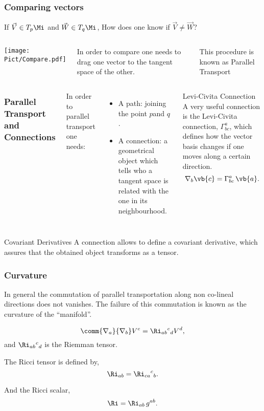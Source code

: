 \begin{frame}
  \frametitle{Comparing vectors}
  If  $\vec{V}\in T_p\Mi$ and $\vec{W}\in T_q\Mi$, How does one know if $\vec{V}\neq \vec{W}$?

  \begin{columns}
    \begin{center}
      \texttt{[image: Pict/Compare.pdf]}
    \end{center}
    In order to compare one needs to drag one vector to the tangent space of the other.

    This procedure is known as \alert{Parallel Transport}
  \end{columns}
\end{frame}

\begin{frame}
  \begin{columns}
    \frametitle{Parallel Transport and Connections}
    In order to parallel transport one needs:
    \begin{itemize}
    \item \alert{A path}: joining the point $p$and $q$.
    \item \alert{A connection}: a geometrical object which tells who a tangent space  is related with the one in its neighbourhood.
    \end{itemize}
    \begin{alertblock}{Levi-Civita Connection}
      A very useful connection is the Levi-Civita connection, $\Gamma^a_{bc}$, which defines how the vector basis changes if one moves along a certain direction.$$\nabla_b \vb{c} = \Gamma^a_{b c}\,\vb{a}.$$
    \end{alertblock}
  \end{columns}

  \begin{block}{Covariant Derivatives}
    A connection allows to define a covariant derivative, which assures that the obtained object transforms as a tensor.
  \end{block}
\end{frame}

\begin{frame}
  \frametitle{Curvature}
  In general the commutation of parallel transportation along non co-lineal directions does not vanishes. The failure of this commutation is known as the \alert{curvature} of the ``manifold''.

$$\comm{\nabla_a}{\nabla_b}V^c= \Ri_{a b}{}^c{}_d V^d,$$
and $\Ri_{a b}{}^c{}_d$ is the Riemman tensor.

The Ricci tensor is defined by,$$\Ri_{a b}= \Ri_{c a}{}^c{}_b.$$

And the Ricci scalar,
\begin{align*}
  \Ri = \Ri_{ ab}\, g^{ab}.
\end{align*}
\end{frame}

